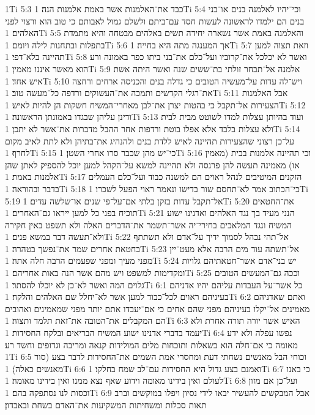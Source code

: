 1Ti 5:3  כבד את־האלמנות אשר באמת אלמנות הנה׃
1Ti 5:4  וכי־יהיו לאלמנה בנים או־בני בנים הם ילמדו לראשונה לעשות חסד עם־ביתם ולשלם גמול לאבותם כי טוב הוא ורצוי לפני האלהים׃
1Ti 5:5  והאלמנה באמת אשר נשארה יחידה תשים באלהים מבטחה והיא מתמדת בתפלות ובתחנות לילה ויומם׃
1Ti 5:6  אך המענגה מתה היא בחייה׃
1Ti 5:7  וזאת תצוה למען תהיינה בלא־דפי׃
1Ti 5:8  ואשר לא יכלכל את־קרוביו ועל־כלם את־בני ביתו כפר באמונה ורע הוא מאשר איננו מאמין׃
1Ti 5:9  אלמנה אל־תבחר זולתי בת־ששים שנה ואשר היתה אשת איש אחד׃
1Ti 5:10  ויש־לה עדות על־מעשיה הטובים כי גדלה בנים והכניסה ארחים ורחצה את־רגלי הקדשים ותמכה את־העשוקים ורדפה כל־מעשה טוב׃
1Ti 5:11  אבל האלמנות הצעירות אל־תקבל כי בהטות יצרן את־לבן מאחרי־המשיח חשקות הן להיות לאיש׃
1Ti 5:12  ודינן עליהן שבגדו באמונתן הראשונה׃
1Ti 5:13  ועוד בהיותן עצלות למדו לשוטט מבית לבית ולא עצלות בלבד אלא אפלו בוטת ורדפות אחר ההבל מדברות את־אשר לא יתכן׃
1Ti 5:14  על־כן רצוני שהצעירות תהיינה לאיש ללדת בנים ולהנהיג את־בתיהן ולא לתת לאיב מקום לחרף׃
1Ti 5:15  כי־יש מהן שכבר סרו אחרי השטן׃
1Ti 5:16  וכי תהיינה אלמנות בבית (מאמין או) מאמינה תעשה להן פרנסה ולא תהיינה למשא על־הקהל למען יוכל להספיק לאתן שהן אלמנות באמת׃
1Ti 5:17  הזקנים המיטיבים לנהל ראוים הם למשנה כבוד ועל־כלם העמלים בדבר ובהוראה׃
1Ti 5:18  כי־הכתוב אמר לא־תחסם שור בדישו ונאמר ראוי הפעל לשכרו׃
1Ti 5:19  אל־תקבל עדות בזקן בלתי אם־על־פי שנים או־שלשה עדים׃
1Ti 5:20  את־החטאים תוכיח בפני כל למען ייראו גם־האחרים׃
1Ti 5:21  הנני מעיד בך נגד האלהים ואדנינו ישוע המשיח ונגד המלאכים בחירי־יה אשר־תשמר את־הדברים האלה ולא תשפט באין חקירה ולא־תעשה דבר במשא פנים׃
1Ti 5:22  אל־תהי נבהל לסמוך ידיך על־אדם ולא תשתתף בחטאת אחרים שמר את־נפשך בטהרה׃
1Ti 5:23  אל־תשתה עוד מים הרבה אלא מעט־יין מפני מעיך ומפני שפעמים הרבה חלה אתה׃
1Ti 5:24  יש בני־אדם אשר־חטאתיהם גלויות ומקדימות למשפט ויש מהם אשר הנה באות אחריהם׃
1Ti 5:25  וככה גם־המעשים הטובים גלוים המה ואשר לא־כן לא יוכלו להסתר׃
1Ti 6:1  כל אשר־על העבדות עליהם יהיו אדניהם בעיניהם ראוים לכל־כבוד למען אשר לא־יחלל שם האלהים והלקח׃
1Ti 6:2  ואתם שאדניהם מאמינים אל־יקלו בעיניהם מפני שהם אחים כי אם־יעבדו אתם יותר מפני שמאמינים ואהובים הם המקבלים את־הטובה את־זאת תלמד ותצוה׃
1Ti 6:3  האיש אשר יורה תורה אחרת ולא יעמד בדברי אדנינו ישוע המשיח הבריאים ובלקח החסידות׃
1Ti 6:4  נפשו עפלה ולא ידע מאומה כי אם־חלה הוא בשאלות ותוכחות מלים המולידות קנאה ומריבה וגדופים וחשד רע׃
1Ti 6:5  וכוחי הבל מאנשים נשחתי דעת ומחסרי אמת השמים את־החסידות לדבר בצע (סור מאנשים כאלה)׃
1Ti 6:6  ואמנם בצע גדול היא החסידות עם־לב שמח בחלקו׃
1Ti 6:7  כי באנו לעולם ואין בידינו מאומה וידוע שאף נצא ממנו ואין בידינו מאומה׃
1Ti 6:8  ועל־כן אם מזון וכסות לנו נסתפקה בהם׃
1Ti 6:9  אבל המבקשים להעשיר יבאו לידי נסיון ויפלו במוקשים וברב תאות סכלות ומשחיתות המשקיעות את־האדם בשחת ובאבדון׃
